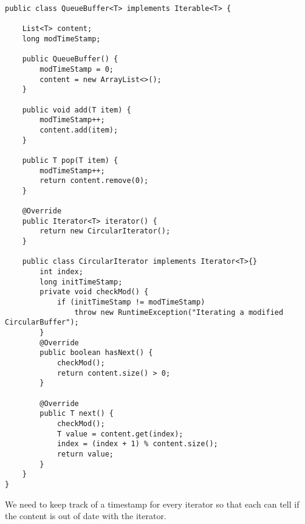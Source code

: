 \begin{solution}
\begin{lstlisting}
public class QueueBuffer<T> implements Iterable<T> {

    List<T> content;
    long modTimeStamp;

    public QueueBuffer() {
        modTimeStamp = 0;
        content = new ArrayList<>();
    }

    public void add(T item) {
        modTimeStamp++;
        content.add(item);
    }

    public T pop(T item) {
        modTimeStamp++;
        return content.remove(0);
    }

    @Override
    public Iterator<T> iterator() {
        return new CircularIterator();
    }

    public class CircularIterator implements Iterator<T>{}
        int index;
        long initTimeStamp;
        private void checkMod() {
            if (initTimeStamp != modTimeStamp)
                throw new RuntimeException("Iterating a modified CircularBuffer");
        }
        @Override
        public boolean hasNext() {
            checkMod();
            return content.size() > 0;
        }

        @Override
        public T next() {
            checkMod();
            T value = content.get(index);
            index = (index + 1) % content.size();
            return value;
        }
    }
}
\end{lstlisting}
\end{solution}
\begin{meta}
We need to keep track of a timestamp for every iterator so that each can tell if the content is out of date with the iterator.
\end{meta}